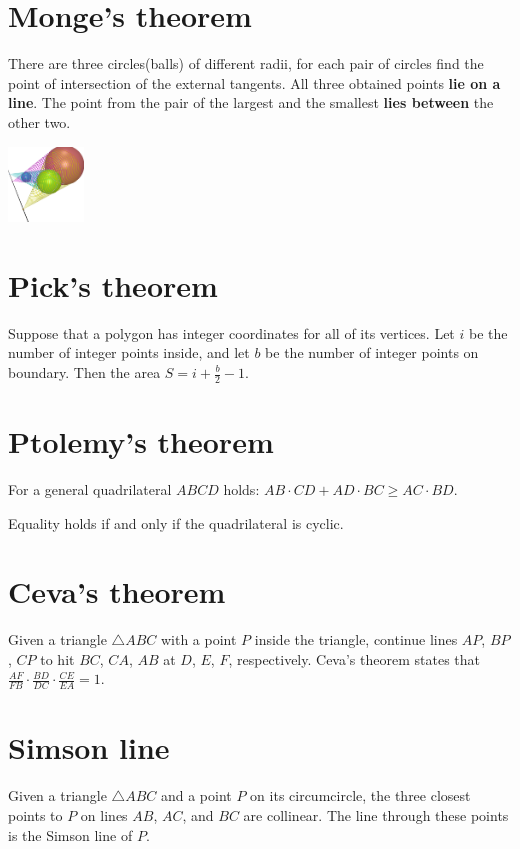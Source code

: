 \section*{Monge's theorem}
There are three circles(balls) of different radii, 
for each pair of circles find the point of intersection of the external tangents. 
All three obtained points \textbf{lie on a line}. 
The point from the pair of the largest and the smallest \textbf{lies between} the other two.

\begin{center}
  \includegraphics[width=0.15\textwidth, center]{content/mathematics/monges-theorem.png}
\end{center}

\section*{Pick's theorem}
Suppose that a polygon has integer coordinates for all of its vertices. 
Let $i$ be the number of integer points inside, and let $b$ be the number of integer points on boundary. 
Then the area $S = i + \tfrac{b}{2} - 1$.

\section*{Ptolemy's theorem}
For a general quadrilateral $ABCD$ holds:
$AB \cdot CD + AD \cdot BC \ge AC \cdot BD$.

Equality holds if and only if the quadrilateral is cyclic.

\section*{Ceva's theorem}
Given a triangle $\triangle ABC$ with a point $P$ inside the triangle,
continue lines $AP$, $BP$, $CP$ to hit $BC$, $CA$, $AB$ at $D$, $E$, $F$,
respectively.
Ceva's theorem states that
$\frac{AF}{FB} \cdot \frac{BD}{DC} \cdot \frac{CE}{EA} = 1$. 

\section*{Simson line}
Given a triangle $\triangle ABC$ and a point $P$ on its circumcircle,
the three closest points to $P$ on lines $AB$, $AC$, and $BC$ are collinear.
The line through these points is the Simson line of $P$.

